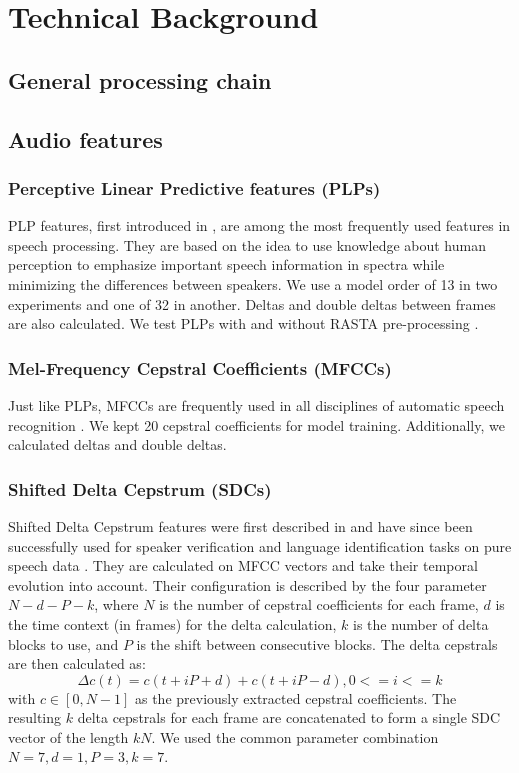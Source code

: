 
\chapter{Technical Background}	\label{chap:background}
\section{General processing chain}
\section{Audio features}
\subsection{Perceptive Linear Predictive features (PLPs)} PLP features, first introduced in \cite{hermansky90}, are among the most frequently used features in speech processing. They are based on the idea to use knowledge about human perception to emphasize important speech information in spectra while minimizing the differences between speakers. We use a model order of 13 in two experiments and one of 32 in another. Deltas and double deltas between frames are also calculated. We test PLPs with and without RASTA pre-processing \cite{rasta_plp}.
\subsection{Mel-Frequency Cepstral Coefficients (MFCCs)} Just like PLPs, MFCCs are frequently used in all disciplines of automatic speech recognition \cite{zissman}. We kept 20 cepstral coefficients for model training. Additionally, we calculated deltas and double deltas.
\subsection{Shifted Delta Cepstrum (SDCs)} Shifted Delta Cepstrum features were first described in \cite{bielefeld} and have since been successfully used for speaker verification and language identification tasks on pure speech data \cite{torres} \cite{campbell} \cite{allen}. They are calculated on MFCC vectors and take their temporal evolution into account. Their configuration is described by the four parameter $N-d-P-k$, where $N$ is the number of cepstral coefficients for each frame, $d$ is the time context (in frames) for the delta calculation, $k$ is the number of delta blocks to use, and $P$ is the shift between consecutive blocks. The delta cepstrals are then calculated as:
\begin{equation}
\Delta c(t) = c(t+iP+d)+c(t+iP-d), 0<=i<=k
\end{equation}
with $c \in [0, N-1]$ as the previously extracted cepstral coefficients. The resulting $k$ delta cepstrals for each frame are concatenated to form a single SDC vector of the length $kN$. We used the common parameter combination $N=7, d=1, P=3, k=7$.
